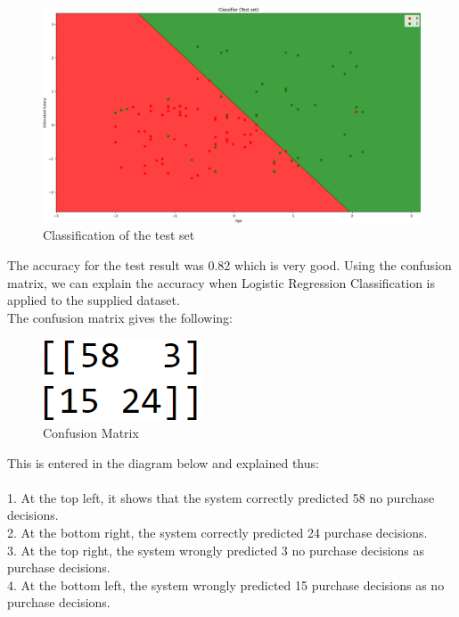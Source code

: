 \documentclass[conference]{IEEEtran}
\begin{document}
\begin{figure}[h]
    \centering
    \includegraphics[scale=0.21]{figs/classTest.png}
    \caption{Classification of the test set}
    \label{dabc}        
\end{figure}

The accuracy for the test result was 0.82 which is very good. Using the confusion matrix, we can explain the accuracy when Logistic Regression Classification is applied to the supplied dataset.\\
The confusion matrix gives the following:\\
\begin{figure}[h]
    \centering
    \includegraphics[scale=0.71]{figs/matrix.png}
    \caption{Confusion Matrix}
    \label{dabc}        
\end{figure}

This is entered in the diagram below and explained thus:\\
\\
1.	At the top left, it shows that the system correctly predicted 58 no purchase decisions.\\
2.	At the bottom right, the system correctly predicted 24 purchase decisions.\\
3.	At the top right, the system wrongly predicted 3 no purchase decisions as purchase decisions.\\
4.	At the bottom left, the system wrongly predicted 15 purchase decisions as no purchase decisions.
\end{document}
